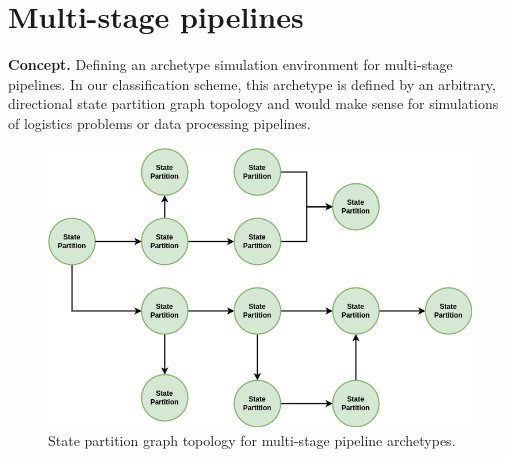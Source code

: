 \chapter{\sffamily Multi-stage pipelines}

{\bfseries\sffamily Concept.} Defining an archetype simulation environment for multi-stage pipelines. In our classification scheme, this archetype is defined by an arbitrary, directional state partition graph topology and would make sense for simulations of logistics problems or data processing pipelines.


\begin{figure}[h]
\centering
\includegraphics[width=12cm]{images/chapter-9-state-partition-graph.drawio.png}
\caption{State partition graph topology for multi-stage pipeline archetypes.}
\label{fig:state-partition-graph-multi-stage-pipelines}
\end{figure}
